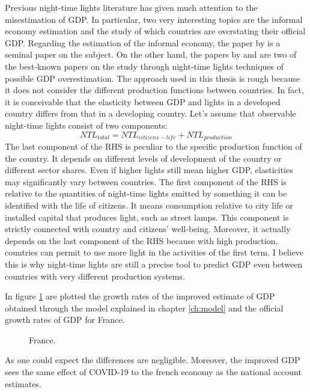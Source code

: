 Previous night-time lights literature has given much attention to the misestimation of GDP. In particular, two very interesting topics are the informal economy estimation and the study of which countries are overstating their official GDP.
Regarding the estimation of the informal economy, the paper by \citet{ghosh2009estimation} is a seminal paper on the subject. On the other hand, the papers by \citet{martinez2018much} and \citet{clark2017china} are two of the best-known papers on the study through night-time lights techniques of possible GDP overestimation.
The approach used in this thesis is rough because it does not consider the different production functions between countries. In fact, it is conceivable that the elasticity between GDP and lights in a developed country differs from that in a developing country. 
Let's assume that observable night-time lights consist of two components:
\begin{equation}
    NTL_{total}=NTL_{citizens-life}+NTL_{production}
\end{equation}
The last component of the RHS is peculiar to the specific production function of the country. It depends on different levels of development of the country or different sector shares. Even if higher lights still mean higher GDP, elasticities may significantly vary between countries.
The first component of the RHS is relative to the quantities of night-time lights emitted by something it can be identified with the life of citizens. It means consumption relative to city life or installed capital that produces light, such as street lamps. 
This component is strictly connected with country and citizens' well-being. Moreover, it actually depends on the last component of the RHS because with high production, countries can permit to use more light in the activities of the first term.
I believe this is why night-time lights are still a precise tool to predict GDP even between countries with very different production systems.

In figure \ref{fig:france} are plotted the growth rates of the improved estimate of GDP obtained through the model explained in chapter \ref{ch:model} and the official growth rates of GDP for France. 
\begin{figure}[h!]
    \centering
    \hspace*{-0.5cm}
    \subfloat{{ }}%
    \caption{France.}%
    \label{fig:france}
\end{figure}
As one could expect the differences are negligible. Moreover, the improved GDP sees the same effect of COVID-19 to the french economy as the national account estimates.

